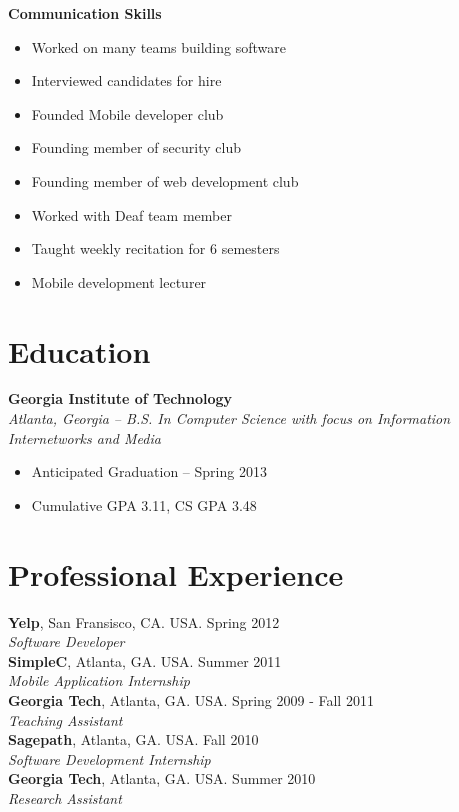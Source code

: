 \documentclass[margin,line]{res}
\begin{document}
\begin{resume}
 {\bf Communication Skills}
    \begin{itemize}
    \item Worked on many teams building software
    \item Interviewed candidates for hire
    \item Founded Mobile developer club
    \item Founding member of security club
    \item Founding member of web development club
    \item Worked with Deaf team member
    \item Taught weekly recitation for 6 semesters
    \item Mobile development lecturer
    \end{itemize}

\section{\sc Education}
    {\bf Georgia Institute of Technology}\\
    {\em Atlanta, Georgia -- B.S. In Computer Science with focus on
      Information Internetworks and Media}
    \begin{itemize}
    \item Anticipated Graduation -- Spring 2013
    \item Cumulative GPA 3.11, CS GPA 3.48
    \end{itemize}

\section{\sc Professional Experience}
    {\bf Yelp}, San Fransisco, CA. USA. \hfill{Spring 2012}\\
    {\em Software Developer}\hfill\\

    {\bf SimpleC}, Atlanta, GA. USA. \hfill{Summer 2011}\\
    {\em Mobile Application Internship} \\

    {\bf Georgia Tech}, Atlanta, GA. USA. \hfill{Spring 2009 - Fall 2011}\\
    {\em Teaching Assistant} \\

    {\bf Sagepath}, Atlanta, GA. USA. \hfill{Fall 2010}\\
    {\em Software Development Internship} \\

    {\bf Georgia Tech}, Atlanta, GA. USA. \hfill{Summer 2010}\\
    {\em Research Assistant} \\

\end{resume}
\end{document}
